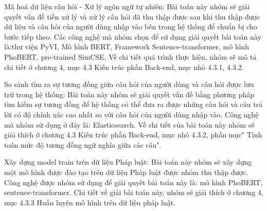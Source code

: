 Mã hoá dữ liệu câu hỏi - Xử lý ngôn ngữ tự nhiên: Bài toán này nhóm sẽ giải quyết vấn đề tiền xử lý và xử lý câu hỏi đã thu thập được sau khi thu thập được dữ liệu và câu hỏi của người dùng nhập vào bên trong hệ thống để chuẩn bị cho bước tiếp theo. Các công nghệ mà nhóm chọn để sử dụng giải quyết bài toán này là:thư viện PyVI, Mô hình BERT, Framework Sentence-transformer, mô hình PhoBERT, pre-trained SimCSE. Về chi tiết quá trình thực hiện, nhóm sẽ mô tả chi tiết ở chương 4, mục 4.3 Kiến trúc phần Back-end, mục nhỏ 4.3.1, 4.3.2.

So sánh tìm ra sự tương đồng giữa câu hỏi của người dùng và câu hỏi được lưu trữ trong hệ thống: Bài toán này nhóm sẽ giải quyết vấn đề bằng phương pháp tìm kiếm sự tương đồng để hệ thống có thể đưa ra được những câu hỏi và câu trả lời có độ chính xác cao nhất so với câu hỏi của người dùng nhập vào. Công nghệ mà nhóm sử dụng ở đây là: Elasticsearch. Về chi tiết của bài toán này nhóm sẽ giải thích ở chương 4.3 Kiến trúc phần Back-end, mục nhỏ 4.3.2, phần mục" Tính toán mức độ tương đồng ngữ nghĩa giữa các câu".

Xây dựng model train trên dữ liệu Pháp luật: Bài toán này nhóm sẽ xây dựng một mô hình được đào tạo trên dữ liệu Pháp luật được nhóm thu thập được. Công nghệ được nhóm sử dụng để giải quyết bài toán này là: mô hình PhoBERT, sentence-transformer. Chi tiết về giải bài toán này, nhóm sẽ giải thích ở chương 4, mục 4.3.3 Huấn luyện mô hình trên dữ liệu pháp luật.


\pagebreak

